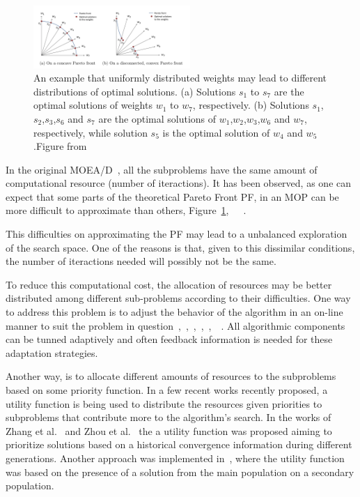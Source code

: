 \begin{figure}[h]
	\centering
	\includegraphics[width=0.53\textwidth]{img/harder_problems2}
	\caption{An example that uniformly distributed weights may lead to different distributions of optimal solutions. (a) Solutions $s_1$ to $s_7$ are the optimal solutions of weights $w_1$ to $w_7$, respectively. (b) Solutions $s_1$,$s_2$,$s_3$,$s_6$ and $s_7$ are the optimal solutions of $w_1$,$w_2$,$w_3$,$w_6$ and $w_7$, respectively, while solution $s_5$ is the optimal solution of $w_4$ and $w_5$.Figure from~\cite{li2017weights}}
	\label{fig3}
\end{figure}

In the original MOEA/D~\cite{zhang2007moea}, all the subproblems have the same amount of computational resource (number of iteractions). It has been observed, as one can expect that some parts of the theoretical Pareto Front PF, in an MOP can be more difficult to approximate than others, Figure~\ref{fig3},~\cite{zhang2009performance}~\cite{zhou2016all}~\cite{kang2018collaborative}.


This difficulties on approximating the PF may lead to a unbalanced exploration of the search space. One of the reasons is that, given to this dissimilar conditions, the number of iteractions needed will possibly not be the same. 

 To reduce this computational cost, the allocation of resources may be better distributed among different sub-problems according to their difficulties. One way to address this problem is to adjust the behavior of the algorithm in an on-line manner to suit the problem in question~\cite{hinterding1997adaptation},~\cite{de2007parameter},~\cite{meyer2007self},~\cite{zhang2009performance},~\cite{kramer2010evolutionary},~\cite{zhang2012survey}~\cite{cai2015external}. All algorithmic components can be tunned adaptively and often feedback information is needed for these adaptation strategies. 

Another way, is to allocate different amounts of resources to the subproblems based on some priority function. In a few recent works recently proposed, a utility function is being used to distribute the resources given priorities to subproblems that contribute more to the algorithm's search.  In the works of Zhang et al.~\cite{zhang2009performance} and Zhou et al.~\cite{zhou2016all} the a utility function was proposed aiming to prioritize solutions based on a historical convergence information during different generations. Another approach was implemented in~\cite{kang2018collaborative}, where the utility function was based on the presence of a solution from the main population on a secondary population.

